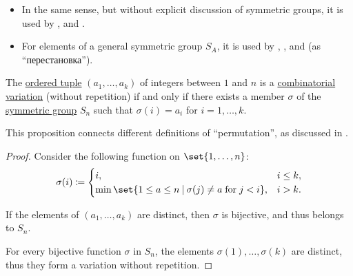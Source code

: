 \begin{remark}
\begin{itemize}
    \item In the same sense, but without explicit discussion of symmetric groups, it is used by
    ,
     and
    .

    \item For elements of a general symmetric group \( S_A \), it is used by
    ,
    ,
     and
     (as \enquote{перестановка}).
  \end{itemize}
\end{remark}

\begin{proposition}\label{thm:combinatorial_and_algebraic_permutation}
  The \hyperref[def:ordered_tuple]{ordered tuple} \( (a_1, \ldots, a_k) \) of integers between \( 1 \) and \( n \) is a \hyperref[def:combinatorial_variation]{combinatorial variation} (without repetition) if and only if there exists a member \( \sigma \) of the \hyperref[def:symmetric_group]{symmetric group} \( S_n \) such that \( \sigma(i) = a_i \) for \( i = 1, \ldots, k \).
\end{proposition}
\begin{comments}
  \item This proposition connects different definitions of \enquote{permutation}, as discussed in .
\end{comments}
\begin{proof}
  \SufficiencySubProof Consider the following function on \( \set{ 1, \ldots, n } \):
  \begin{equation*}
    \sigma(i) \coloneqq \begin{cases}
      i,                                                                  &i \leq k, \\
      \min\set{ 1 \leq a \leq n \given \sigma(j) \neq a \T{for} j < i }, &i > k.
    \end{cases}
  \end{equation*}

  If the elements of \( (a_1, \ldots, a_k) \) are distinct, then \( \sigma \) is bijective, and thus belongs to \( S_n \).

  \NecessitySubProof For every bijective function \( \sigma \) in \( S_n \), the elements \( \sigma(1), \ldots, \sigma(k) \) are distinct, thus they form a variation without repetition.
\end{proof}

